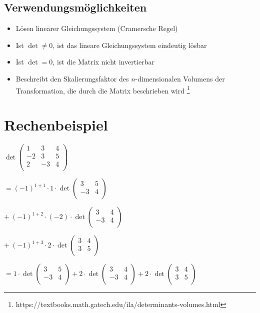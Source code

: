 \documentclass[11pt,a4paper]{article}
\begin{document}
\subsection{Verwendungsmöglichkeiten}
\begin{itemize}
	\item Lösen linearer Gleichungssystem (Cramersche Regel)
	\item Ist $\det \neq 0$, ist das lineare Gleichungssystem eindeutig lösbar
	\item Ist $\det = 0$, ist die Matrix nicht invertierbar
	\item Beschreibt den Skalierungsfaktor des $n$-dimensionalen Volumens der Transformation, die durch die Matrix beschrieben wird \footnote{https://textbooks.math.gatech.edu/ila/determinants-volumes.html}
\end{itemize}

\newpage
\section{Rechenbeispiel}
$
\det
\left(
	\begin{array}{rrr}
	1 & 3 & 4\\
	-2 & 3 & 5\\
	2 & -3 & 4\\
	\end{array}
\right)
$

$
= (-1)^{1+1} \cdot 1 \cdot \det 
\left(
	\begin{array}{rr}
	3 & 5\\
	-3 & 4\\
	\end{array}
\right)
$

$
+ ~(-1)^{1+2} \cdot (-2) \cdot \det 
\left(
\begin{array}{rr}
3 & 4\\
-3 & 4\\
\end{array}
\right)
$

$
+ ~(-1)^{1+3} \cdot 2 \cdot \det
\left(
\begin{array}{rr}
3 & 4\\
3 & 5\\
\end{array}
\right)
$

$
= 1 \cdot \det 
\left(
\begin{array}{rr}
	3 & 5\\
	-3 & 4\\
\end{array}
\right)
+ 2 \cdot \det 
\left(
\begin{array}{rr}
3 & 4\\
-3 & 4\\
\end{array}
\right)
+ 2 \cdot \det 
\left(
\begin{array}{rr}
3 & 4\\
3 & 5\\
\end{array}
\right)
$
\end{document}
